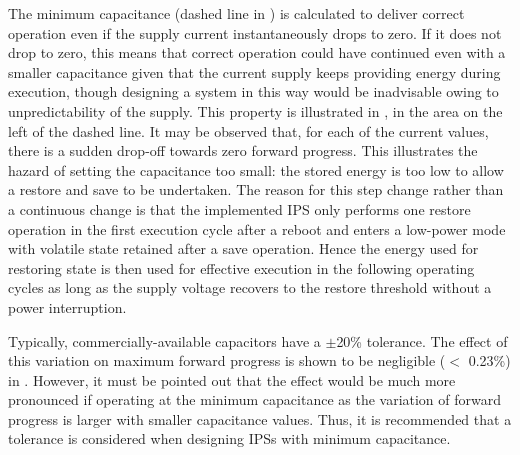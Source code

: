 The minimum capacitance (dashed line in ) is calculated to deliver correct operation even if the supply current instantaneously drops to zero. 
If it does not drop to zero, this means that correct operation could have continued even with a smaller capacitance given that the current supply keeps providing energy during execution, though designing a system in this way would be inadvisable owing to unpredictability of the supply. 
This property is illustrated in , in the area on the left of the dashed line. 
It may be observed that, for each of the current values, there is a sudden drop-off towards zero forward progress. 
This illustrates the hazard of setting the capacitance too small: the stored energy is too low to allow a restore and save to be undertaken.
The reason for this step change rather than a continuous change is that the implemented IPS only performs one restore operation in the first execution cycle after a reboot and enters a low-power mode with volatile state retained after a save operation. 
Hence the energy used for restoring state is then used for effective execution in the following operating cycles as long as the supply voltage recovers to the restore threshold without a power interruption.
 
Typically, commercially-available capacitors have a $\pm$20\% tolerance. 
The effect of this variation on maximum forward progress is shown to be negligible ($<$ 0.23\%) in . 
However, it must be pointed out that the effect would be much more pronounced if operating at the minimum capacitance as the variation of forward progress is larger with smaller capacitance values. 
Thus, it is recommended that a tolerance is considered when designing IPSs with minimum capacitance.

